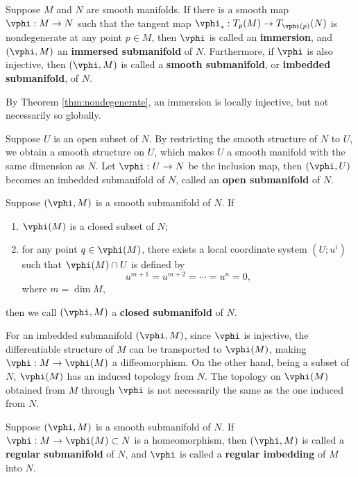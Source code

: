 \documentclass[11pt]{article}
\begin{document}
\begin{definition}
    Suppose $M$ and $N$ are smooth manifolds. If there is a smooth map $\vphi: M \rightarrow N$ such that the tangent map $\vphi_* : T_p(M) \rightarrow T_{\vphi(p)}(N)$ is nondegenerate at any point $p \in M$, then $\vphi$ is called an \textbf{immersion}, and $(\vphi, M)$ an \textbf{immersed submanifold} of $N$. Furthermore, if $\vphi$ is also injective, then $(\vphi, M)$ is called a \textbf{smooth submanifold}, or \textbf{imbedded submanifold}, of $N$. 
\end{definition}

By Theorem \ref{thm:nondegenerate}, an immersion is locally injective, but not necessarily so globally. 

\begin{example}
    Suppose $U$ is an open subset of $N$. By restricting the smooth structure of $N$ to $U$, we obtain a smooth structure on $U$, which makes $U$ a smooth manifold with the same dimension as $N$. Let $\vphi : U \rightarrow N$ be the inclusion map, then $(\vphi, U)$ becomes an imbedded submanifold of $N$, called an \textbf{open submanifold} of $N$. 
\end{example}

\begin{example}
    Suppose $(\vphi, M)$ is a smooth submanifold of $N$. If
    \begin{enumerate}
        \item $\vphi(M)$ is a closed subset of $N$;
        \item for any point $q \in \vphi(M)$, there exists a local coordinate system $(U;u^i)$ such that $\vphi(M) \cap U$ is defined by $$u^{m+1} = u^{m+2} = \cdots = u^n = 0,$$ where $m = \dim M$,
    \end{enumerate}
    then we call $(\vphi, M)$ a \textbf{closed submanifold} of $N$. 
\end{example}

For an imbedded submanifold $(\vphi, M)$, since $\vphi$ is injective, the differentiable structure of $M$ can be transported to $\vphi(M)$, making $\vphi : M \rightarrow \vphi(M)$ a diffeomorphism. On the other hand, being a subset of $N$, $\vphi(M)$ has an induced topology from $N$. The topology on $\vphi(M)$ obtained from $M$ through $\vphi$ is not necessarily the same as the one induced from $N$.

\begin{definition}
    Suppose $(\vphi, M)$ is a smooth submanifold of $N$. If $\vphi : M \rightarrow \vphi(M) \subset N$ is a homeomorphism, then $(\vphi, M)$ is called a \textbf{regular submanifold} of $N$, and $\vphi$ is called a \textbf{regular imbedding} of $M$ into $N$. 
\end{definition}
\end{document}
